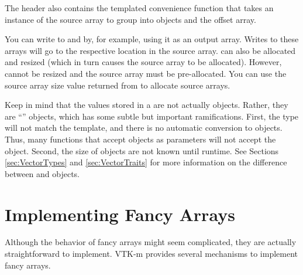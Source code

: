 
The  header also contains the templated convenience function  that takes an instance of the source array to group into \Veclike objects and the offset array.


\begin{didyouknow}
  You can write to  and  by, for example, using it as an output array.
  Writes to these arrays will go to the respective location in the source array.
   can also be allocated and resized (which in turn causes the source array to be allocated).
  However,  cannot be resized and the source array must be pre-allocated.
  You can use the source array size value returned from  to allocate source arrays.
\end{didyouknow}

\begin{commonerrors}
  Keep in mind that the values stored in a  are not actually  objects.
  Rather, they are ``\Veclike'' objects, which has some subtle but important ramifications.
  First, the type will not match the  template, and there is no automatic conversion to  objects.
  Thus, many functions that accept  objects as parameters will not accept the \Veclike object.
  Second, the size of \Veclike objects are not known until runtime.
  See Sections \ref{sec:VectorTypes} and \ref{sec:VectorTraits} for more information on the difference between  and \Veclike objects.
\end{commonerrors}



\section{Implementing Fancy Arrays}
\label{sec:ImplementingFancyArrays}

Although the behavior of fancy arrays might seem complicated, they are
actually straightforward to implement. VTK-m provides several mechanisms to
implement fancy arrays.

